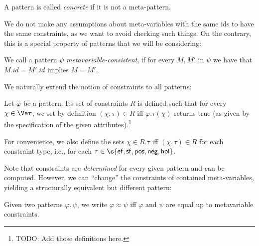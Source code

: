 \documentclass{mgr}
\begin{document}
\begin{definition}
  A pattern is called \emph{concrete} if it is not a meta-pattern.
\end{definition}

We do not make any assumptions about meta-variables with the same ids to have the same constraints, as we want to avoid checking such things.
On the contrary, this is a special property of patterns that we will be considering:
\begin{definition}
  We call a pattern $\psi$ \emph{metavariable-consistent}, if for every $M, M'$ in $\psi$ we have that $M.id = M'.id$ implies $M = M'$.
\end{definition}

\iffalse
\begin{definition}[Pattern renaming]
  Let $\varphi$ a pattern.
  Then $\psi$ is a renaming of $\varphi$ if there is a variable renaming $s : \Var \to \Var$ such that $\psi s$ is $\alpha$-equivalent to $\varphi$.
\end{definition}
\fi

We naturally extend the notion of constraints to all patterns:

\begin{definition}
  Let $\varphi$ be a pattern.
  Its set of constraints $R$ is defined such that for every $\chi \in \Var$, we set by definition $(\chi, \tau) \in R$ iff $\varphi.\tau(\chi)$ returns true (as given by the specification of the given attributes).\footnote{TODO: Add those definitions here.}

  For convenience, we also define the sets $\chi \in R.\tau$ iff $(\chi, \tau) \in R$ for each constraint type, i.e., for each $\tau \in \s{\Ef, \Sf, \Pos, \Neg, \Hol}$.
\end{definition}

Note that constraints are \emph{determined} for every given pattern and can be computed.
However, we can ``change'' the constraints of contained meta-variables, yielding a structurally equivalent but different pattern:
\begin{definition}
  Given two patterns $\varphi, \psi$, we write $\varphi \approx \psi$ iff $\varphi$ and $\psi$ are equal up to metavariable constraints.
\end{definition}
\end{document}
